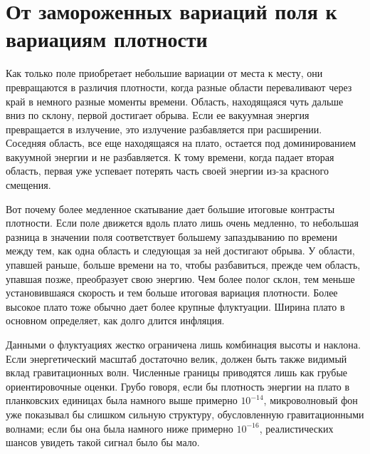 \begin{classroomqa}
\end{classroomqa}

\section{От замороженных вариаций поля к вариациям плотности}

Как только поле приобретает небольшие вариации от места к месту, они превращаются в различия плотности, когда разные области переваливают через край в немного разные моменты времени. Область, находящаяся чуть дальше вниз по склону, первой достигает обрыва. Если ее вакуумная энергия превращается в излучение, это излучение разбавляется при расширении. Соседняя область, все еще находящаяся на плато, остается под доминированием вакуумной энергии и не разбавляется. К тому времени, когда падает вторая область, первая уже успевает потерять часть своей энергии из-за красного смещения.

Вот почему более медленное скатывание дает большие итоговые контрасты плотности. Если поле движется вдоль плато лишь очень медленно, то небольшая разница в значении поля соответствует большему запаздыванию по времени между тем, как одна область и следующая за ней достигают обрыва. У области, упавшей раньше, больше времени на то, чтобы разбавиться, прежде чем область, упавшая позже, преобразует свою энергию. Чем более полог склон, тем меньше установившаяся скорость и тем больше итоговая вариация плотности. Более высокое плато тоже обычно дает более крупные флуктуации. Ширина плато в основном определяет, как долго длится инфляция.

Данными о флуктуациях жестко ограничена лишь комбинация высоты и наклона. Если энергетический масштаб достаточно велик, должен быть также видимый вклад гравитационных волн. Численные границы приводятся лишь как грубые ориентировочные оценки. Грубо говоря, если бы плотность энергии на плато в планковских единицах была намного выше примерно \(10^{-14}\), микроволновый фон уже показывал бы слишком сильную структуру, обусловленную гравитационными волнами; если бы она была намного ниже примерно \(10^{-16}\), реалистических шансов увидеть такой сигнал было бы мало. 

